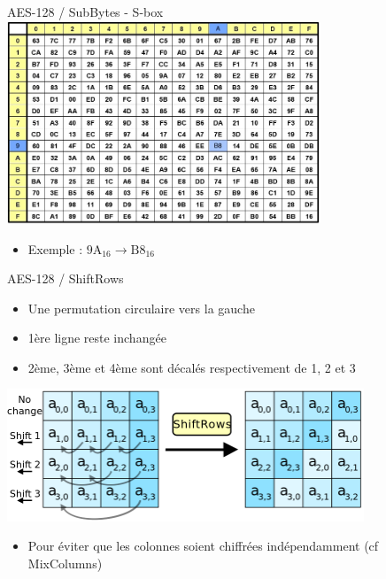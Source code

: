 \documentclass{beamer}
\begin{document}
\begin{frame}{AES-128 / SubBytes - S-box}
    \centering
    \includegraphics[width=0.7\textwidth]{images/AES_Sbox.jpg}
    \begin{itemize}
		\item  Exemple : $9\text{A}_{16} \longrightarrow \text{B}8_{16} $
	\end{itemize}
\end{frame}

\begin{frame}{AES-128 / ShiftRows}
    \begin{itemize}
        \item Une permutation circulaire vers la gauche
        \item 1ère ligne reste inchangée
        \item 2ème, 3ème et 4ème sont décalés respectivement de 1, 2 et 3
    \end{itemize}
    \vspace{0.5 cm}
    \centering
    \includegraphics[width=0.8\textwidth]{images/AES-ShiftRows.png}
    \begin{itemize}
        \item Pour éviter que les colonnes soient chiffrées indépendamment (cf MixColumns)
    \end{itemize}
\end{frame}

\def\MixColumn{\begin{pmatrix} 
  2 & 3 & 1 & 1 \\ 
  1 & 2 & 3 & 1 \\ 
  1 & 1 & 2 & 3 \\ 
  3 & 1 & 1 & 2 \\ 
  \end{pmatrix}}
 
\end{document}
